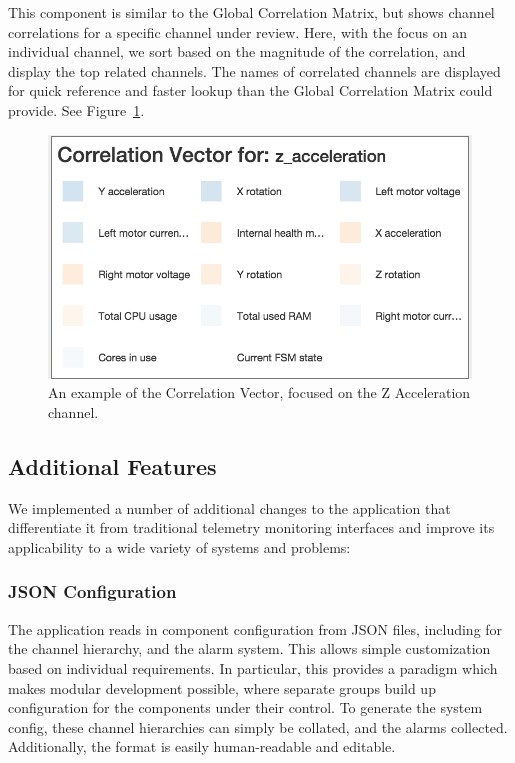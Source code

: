 \documentclass[letterpaper, 10 pt, conference]{ieeeconf}  %
\begin{document}
This component is similar to the Global Correlation Matrix, but shows channel correlations for a specific channel under review. Here, with the focus on an individual channel, we sort based on the magnitude of the correlation, and display the top related channels. The names of correlated channels are displayed for quick reference and faster lookup than the Global Correlation Matrix could provide.  See Figure~\ref{fig:cv}.

\begin{figure}[h]
\centering
    \includegraphics[width=\columnwidth]{cv2.png}
    \caption{An example of the Correlation Vector, focused on the Z Acceleration channel.}
    \label{fig:cv}
\end{figure}

\subsection{Additional Features}

We implemented a number of additional changes to the application that differentiate it from traditional telemetry monitoring interfaces and improve its applicability to a wide variety of systems and problems:

\subsubsection{JSON Configuration}

The application reads in component configuration from JSON files, including for the channel hierarchy, and the alarm system. This allows simple customization based on individual requirements. In particular, this provides a paradigm which makes modular development possible, where separate groups build up configuration for the components under their control. To generate the system config, these channel hierarchies can simply be collated, and the alarms collected. Additionally, the format is easily human-readable and editable.
\end{document}
